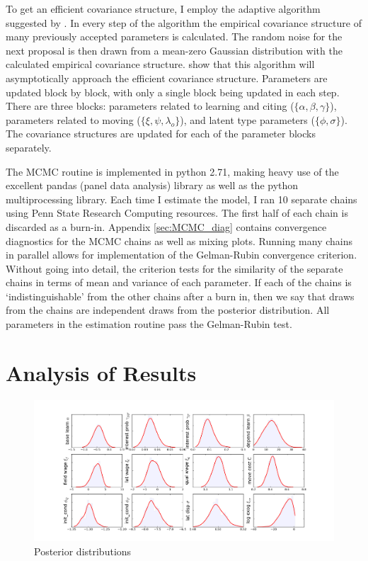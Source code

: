 To get an efficient covariance structure, I employ the adaptive
algorithm suggested by \citet{haario2001adaptive}. In every step of the
algorithm the empirical covariance structure of many previously accepted
parameters is calculated. The random noise for the next proposal is then
drawn from a mean-zero Gaussian distribution with the calculated
empirical covariance structure. \citet{haario2001adaptive} show that
this algorithm will asymptotically approach the efficient covariance
structure. Parameters are updated block by block, with only a single
block being updated in each step. There are three blocks: parameters
related to learning and citing ($\{\alpha,\beta,\gamma\}$), parameters
related to moving ($\{\xi,\psi,\lambda_o\}$), and latent type parameters
($\{\phi,\sigma\}$). The covariance structures are updated for each of
the parameter blocks separately.

The MCMC routine is implemented in python 2.71, making heavy use of the
excellent pandas (panel data analysis) library as well as
the python multiprocessing library. Each time I estimate the model, I ran 10 separate
chains using Penn State Research Computing resources.
The first half of each chain is discarded as a burn-in.
Appendix \ref{sec:MCMC_diag} contains convergence
diagnostics for the MCMC chains as well as mixing plots. Running many
chains in parallel allows for implementation of the Gelman-Rubin
convergence criterion.\citep{gelman1992inference} Without going into detail, the criterion tests
for the similarity of the separate chains in terms of mean and
variance of each parameter. If each of the chains is `indistinguishable'
from the other chains after a burn in, then we say that draws from the
chains are independent draws from the posterior distribution. All
parameters in the estimation routine pass the Gelman-Rubin test.

\section{Analysis of Results}

\begin{figure}[!ht]
    \centering
    \includegraphics[scale=0.35]{pics/params_dists_big.png}
    \caption{Posterior distributions}
    \label{fig:big_params}
\end{figure}

